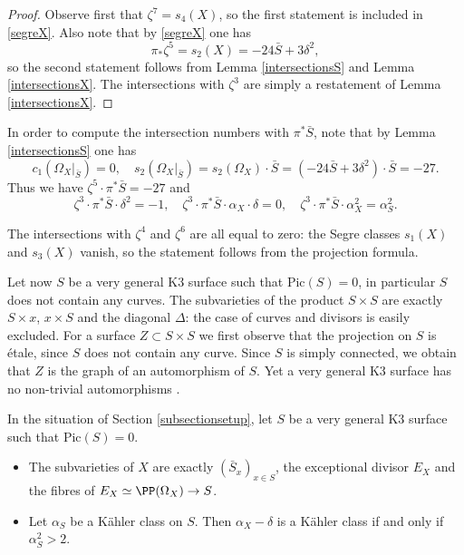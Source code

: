 \begin{proof}
Observe first that $\zeta^7= s_4(X)$, so the first statement is included in \eqref{segreX}.
Also note that by \eqref{segreX} one has
\[
\pi_* \zeta^5 = s_2(X) = - 24 \bar S + 3 \delta^2,
\]
so the second statement follows from Lemma \ref{intersectionsS} and Lemma \ref{intersectionsX}.
The intersections with $\zeta^3$ are simply a restatement of Lemma \ref{intersectionsX}.
\end{proof}

In order to compute the intersection numbers with $\pi^* \bar S$, note that by Lemma \ref{intersectionsS}
one has
\[
c_1(\Omega_X|_{\bar S})= 0 , \quad
s_2(\Omega_X|_{\bar S}) = s_2(\Omega_X) \cdot \bar S = (-24 \bar S + 3 \delta^2) \cdot \bar S = - 27.
\]
Thus we have $\zeta^5 \cdot \pi^* \bar S= -27$ and
\begin{equation} \label{up7}
\zeta^3 \cdot \pi^* \bar S \cdot \delta^2 = -1, \quad
\zeta^3 \cdot \pi^* \bar S \cdot \alpha_X \cdot \delta = 0, \quad
\zeta^3 \cdot \pi^* \bar S \cdot \alpha_X^2 = \alpha_S^2.
\end{equation}

The intersections with $\zeta^4$ and $\zeta^6$ are all equal to zero: the
Segre classes $s_1(X)$ and $s_3(X)$ vanish, so the statement follows from the projection formula.

Let now $S$ be a very general K3 surface such that $\mbox{Pic}(S)=0$, in particular $S$ does not contain any curves.
The subvarieties of the product $S \times S$ are exactly $S \times x$, $x \times S$ and the diagonal $\Delta$: the case
of curves and divisors is easily excluded. For a surface $Z \subset S \times S$ we first observe
that the projection on $S$ is étale, since $S$ does not contain any curve. Since $S$ is simply connected, we obtain
that $Z$ is the graph of an automorphism of $S$. Yet a very general K3 surface has no non-trivial automorphisms \cite[Cor.\,1.6]{Ogu08}.

\begin{lemma} \label{lemmakaehlerX}
In the situation of Section \ref{subsectionsetup},
let $S$ be a very general K3 surface such that $\mbox{Pic}(S)=0$.
\begin{itemize}
\item The subvarieties of $X$ are exactly $(\bar S_x)_{x \in S}$, the exceptional divisor $E_X$ and the fibres of $E_X \simeq \PP(\Omega_X) \to S$.
\item Let $\alpha_S$ be a Kähler class on $S$. Then $\alpha_X-\delta$ is a Kähler class if and only if
$\alpha_S^2>2$.
\end{itemize}
\end{lemma}


